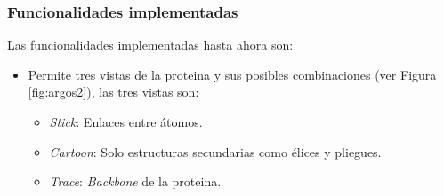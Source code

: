 \documentclass{article}
\begin{document}
\subsubsection{Funcionalidades implementadas}

Las funcionalidades implementadas hasta ahora son:

\begin{itemize}
	\item Permite tres vistas de la proteina y sus posibles combinaciones (ver Figura \ref{fig:argos2}), las tres vistas son: 
		\begin{itemize}
			\item \textit{Stick}: Enlaces entre átomos.
			\item \textit{Cartoon}: Solo estructuras secundarias como élices y pliegues.
			\item \textit{Trace}: \textit{Backbone} de la proteina.
		\end{itemize}


\end{itemize}
\end{document}
